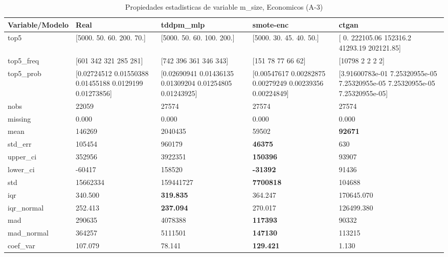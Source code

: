 \begin{table}[H]
\centering
\fontsize{8}{14}\selectfont
\caption{Propiedades  estadisticas de variable m\_size, Economicos (A-3)}
\label{table-stats-economicos-a-3-m_size}
\begin{tabular}{|l|m{10em}|m{10em}|m{10em}|m{10em}|}
\hline
 \rowcolor[gray]{0.8}
Variable/Modelo & Real & tddpm\_mlp & smote-enc & ctgan \\
\hline top5 & [5000.   50.   60.  200.   70.] & [5000.   50.   60.  100.  200.] & [5000.   30.   45.   40.   50.] & [     0.   222105.06 152316.2   41293.19 202121.85] \\
\hline top5\_freq & [601 342 321 285 281] & [742 396 361 346 343] & [151  78  77  66  62] & [10798     2     2     2     2] \\
\hline top5\_prob & [0.02724512 0.01550388 0.01455188 0.0129199  0.01273856] & [0.02690941 0.01436135 0.01309204 0.01254805 0.01243925] & [0.00547617 0.00282875 0.00279249 0.00239356 0.00224849] & [3.91600783e-01 7.25320955e-05 7.25320955e-05 7.25320955e-05
 7.25320955e-05] \\
\hline nobs & 22059 & 27574 & 27574 & 27574 \\
\hline missing & 0.000 & 0.000 & 0.000 & 0.000 \\
\hline mean & 146269 & \cellcolor[rgb]{0.9, 0.54, 0.52} 2040435 & 59502 & \bfseries 92671 \\
\hline std\_err & 105454 & \cellcolor[rgb]{0.9, 0.54, 0.52} 960179 & \bfseries 46375 & 630 \\
\hline upper\_ci & 352956 & \cellcolor[rgb]{0.9, 0.54, 0.52} 3922351 & \bfseries 150396 & 93907 \\
\hline lower\_ci & -60417 & \cellcolor[rgb]{0.9, 0.54, 0.52} 158520 & \bfseries -31392 & 91436 \\
\hline std & 15662334 & \cellcolor[rgb]{0.9, 0.54, 0.52} 159441727 & \bfseries 7700818 & 104688 \\
\hline iqr & 340.500 & \bfseries 319.835 & 364.247 & \cellcolor[rgb]{0.9, 0.54, 0.52} 170645.070 \\
\hline iqr\_normal & 252.413 & \bfseries 237.094 & 270.017 & \cellcolor[rgb]{0.9, 0.54, 0.52} 126499.380 \\
\hline mad & 290635 & \cellcolor[rgb]{0.9, 0.54, 0.52} 4078388 & \bfseries 117393 & 90332 \\
\hline mad\_normal & 364257 & \cellcolor[rgb]{0.9, 0.54, 0.52} 5111501 & \bfseries 147130 & 113215 \\
\hline coef\_var & 107.079 & 78.141 & \bfseries 129.421 & \cellcolor[rgb]{0.9, 0.54, 0.52} 1.130 \\

\end{tabular}
\end{table}
